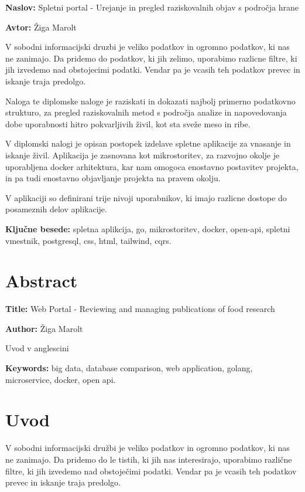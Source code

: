 \documentclass[a4paper, 12pt]{book}
\newcommand{\ttitle}{Spletni portal - Urejanje in pregled raziskovalnih objav s področja hrane}
\newcommand{\ttitleEn}{Web Portal -  Reviewing and managing publications of food research }
\newcommand{\tauthor}{Žiga Marolt}
\newcommand{\tkeywords}{spletna aplikcija, go, mikrostoritev, docker, open-api, spletni vmestnik, postgresql, css, html, tailwind, cqrs}
\newcommand{\tkeywordsEn}{big data, database comparison, web application, golang, microservice, docker, open api}
\newcommand{\clearemptydoublepage}{\newpage{\pagestyle{empty}\cleardoublepage}}
\begin{document}
\noindent\textbf{Naslov:} \ttitle
\bigskip

\noindent\textbf{Avtor:} \tauthor
\bigskip

\noindent
V sobodni informacijski druzbi je veliko podatkov in ogromno podatkov, ki nas ne zanimajo. Da pridemo do podatkov, ki jih zelimo, uporabimo razlicne filtre, ki jih izvedemo nad obstojecimi podatki. Vendar pa je vcasih teh podatkov prevec in iskanje traja predolgo.

Naloga te diplomske naloge je raziskati in dokazati najbolj primerno podatkovno strukturo, za pregled raziskovalnih metod s področja analize in napovedovanja dobe uporabnosti hitro pokvarljivih živil, kot sta sveže meso in ribe. 

V diplomski nalogi je opisan postopek izdelave spletne aplikacije za vnasanje in iskanje živil. Aplikacija je zasnovana kot mikrostoritev, za razvojno okolje je uporabljena docker arhitektura, kar nam omogoca enostavno postavitev projekta, in pa tudi enostavno objavljanje projekta na pravem okolju. 

V aplikaciji so definirani trije nivoji uporabnikov, ki imajo razlicne dostope do posameznih delov aplikacije. 
\bigskip

\noindent\textbf{Ključne besede:} \tkeywords.
\clearemptydoublepage

\chapter*{Abstract}

\noindent\textbf{Title:} \ttitleEn
\bigskip

\noindent\textbf{Author:} \tauthor
\bigskip

\noindent
Uvod v anglescini
\bigskip

\noindent\textbf{Keywords:} \tkeywordsEn.
\clearemptydoublepage

\mainmatter
\setcounter{page}{1}
\pagestyle{fancy}

\chapter{Uvod}

V sobodni informacijski družbi je veliko podatkov in ogromno podatkov, ki nas ne zanimajo. Da pridemo do le tistih, ki jih nas interesirajo, uporabimo različne filtre, ki jih izvedemo nad obstoječimi podatki. Vendar pa je vcasih teh podatkov prevec in iskanje traja predolgo.
\end{document}
